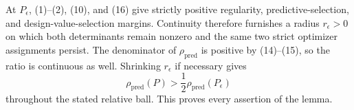 At \(P_\epsilon\), (1)--(2), (10), and (16) give strictly positive regularity, predictive-selection, and design-value-selection margins.  Continuity therefore furnishes a radius \(r_\epsilon>0\) on which both determinants remain nonzero and the same two strict optimizer assignments persist.  The denominator of \(\rho_{\mathrm{pred}}\) is positive by (14)--(15), so the ratio is continuous as well.  Shrinking \(r_\epsilon\) if necessary gives
\[
 \rho_{\mathrm{pred}}(P)>\frac12\rho_{\mathrm{pred}}(P_\epsilon)
\]
throughout the stated relative ball.  This proves every assertion of the lemma.